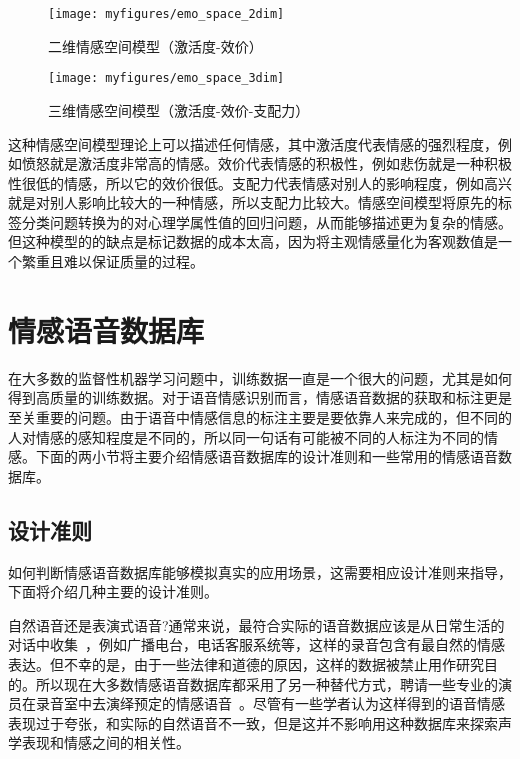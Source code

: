 \begin{figure}[htb] %
    \centering
    \texttt{[image: myfigures/emo\_space\_2dim]}
    \caption{二维情感空间模型（激活度-效价）~\cite{Cowie2002Emotion}}
    \label{fig:emo_space_2dim}
\end{figure}

\begin{figure}[htb] %
    \centering
    \texttt{[image: myfigures/emo\_space\_3dim]}
    \caption{三维情感空间模型（激活度-效价-支配力）~\cite{Cowie2002Emotion}}
    \label{fig:emo_space_3dim}
\end{figure}

这种情感空间模型理论上可以描述任何情感，其中激活度代表情感的强烈程度，例如愤怒就是激活度非常高的情感。效价代表情感的积极性，例如悲伤就是一种积极性很低的情感，所以它的效价很低。支配力代表情感对别人的影响程度，例如高兴就是对别人影响比较大的一种情感，所以支配力比较大。情感空间模型将原先的标签分类问题转换为的对心理学属性值的回归问题，从而能够描述更为复杂的情感。但这种模型的的缺点是标记数据的成本太高，因为将主观情感量化为客观数值是一个繁重且难以保证质量的过程。

\section{情感语音数据库}
\label{sec:emo_speech_database}
在大多数的监督性机器学习问题中，训练数据一直是一个很大的问题，尤其是如何得到高质量的训练数据。对于语音情感识别而言，情感语音数据的获取和标注更是至关重要的问题。由于语音中情感信息的标注主要是要依靠人来完成的，但不同的人对情感的感知程度是不同的，所以同一句话有可能被不同的人标注为不同的情感。下面的两小节将主要介绍情感语音数据库的设计准则和一些常用的情感语音数据库。

\subsection{设计准则}
\label{ssec:design_criteria}
如何判断情感语音数据库能够模拟真实的应用场景，这需要相应设计准则来指导，下面将介绍几种主要的设计准则。

自然语音还是表演式语音?通常来说，最符合实际的语音数据应该是从日常生活的对话中收集~\cite{Campbell2000Databases}，例如广播电台，电话客服系统等，这样的录音包含有最自然的情感表达。但不幸的是，由于一些法律和道德的原因，这样的数据被禁止用作研究目的。所以现在大多数情感语音数据库都采用了另一种替代方式，聘请一些专业的演员在录音室中去演绎预定的情感语音~\cite{Mazuka2015Emotions}。尽管有一些学者认为这样得到的语音情感表现过于夸张，和实际的自然语音不一致，但是这并不影响用这种数据库来探索声学表现和情感之间的相关性。

